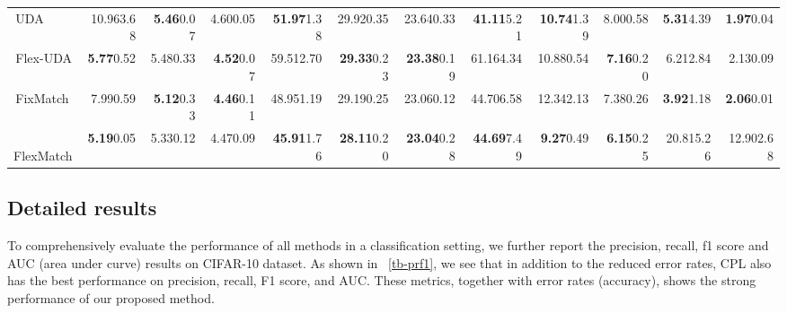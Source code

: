 \begin{table}[hbp!]
\begin{adjustbox}{width=\columnwidth,center}
\begin{tabular}{@{}l|rrr|rrr|rrr|rr@{}}
 \,UDA    & 10.96{\scriptsize 3.68}  & \textbf{5.46}{\scriptsize 0.07}  & 4.60{\scriptsize 0.05}  & \textbf{51.97}{\scriptsize 1.38}  & 29.92{\scriptsize 0.35}  & 23.64{\scriptsize 0.33}  & \textbf{41.11}{\scriptsize 5.21}  & \textbf{10.74}{\scriptsize 1.39}  & 8.00{\scriptsize 0.58}  & \textbf{5.31}{\scriptsize 4.39}  & \textbf{1.97}{\scriptsize 0.04}  
\\
 \,Flex-UDA & \textbf{5.77}{\scriptsize 0.52}  & 5.48{\scriptsize 0.33}  & \textbf{4.52}{\scriptsize 0.07}  & 59.51{\scriptsize 2.70}  & \textbf{29.33}{\scriptsize 0.23}  & \textbf{23.38}{\scriptsize 0.19}  & 61.16{\scriptsize 4.34}  & 10.88{\scriptsize 0.54}  & \textbf{7.16}{\scriptsize 0.20}  & 6.21{\scriptsize 2.84}  & 2.13{\scriptsize 0.09}  
\\ \cmidrule(r){1-1}\cmidrule(lr){2-4}\cmidrule(lr){5-7}\cmidrule(lr){8-10} \cmidrule(l){11-12}
 
 \,FixMatch & 7.99{\scriptsize 0.59}  & \textbf{5.12}{\scriptsize 0.33}  & \textbf{4.46}{\scriptsize 0.11}  & 48.95{\scriptsize 1.19}  & 29.19{\scriptsize 0.25}  & 23.06{\scriptsize 0.12}  & 44.70{\scriptsize 6.58}  & 12.34{\scriptsize 2.13}  & 7.38{\scriptsize 0.26}  & \textbf{3.92}{\scriptsize 1.18}  & \textbf{2.06}{\scriptsize 0.01}  
\\
 
 \,FlexMatch & \textbf{5.19}{\scriptsize 0.05}  & 5.33{\scriptsize 0.12}  & 4.47{\scriptsize 0.09}  & \textbf{45.91}{\scriptsize 1.76}  & \textbf{28.11}{\scriptsize 0.20}  & \textbf{23.04}{\scriptsize 0.28}  & \textbf{44.69}{\scriptsize 7.49}  & \textbf{9.27}{\scriptsize 0.49}  & \textbf{6.15}{\scriptsize 0.25}  & 20.81{\scriptsize 5.26}  & 12.90{\scriptsize 2.68}  
\\ \bottomrule
 
\end{tabular}
\end{adjustbox}
\end{table}

\subsection{Detailed results}
To comprehensively evaluate the performance of all methods in a classification setting, we further report the precision, recall, f1 score and AUC (area under curve) results on CIFAR-10 dataset. As shown in \tablename~\ref{tb-prf1}, we see that in addition to the reduced error rates, CPL also has the best performance on precision, recall, F1 score, and AUC. These metrics, together with error rates (accuracy), shows the strong performance of our proposed method.

